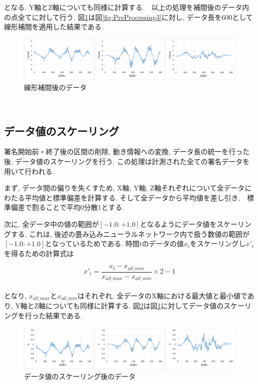 \noindent
となる. Y軸とZ軸についても同様に計算する.　以上の処理を補間後のデータ内の点全てに対して行う. 図\ref{fig:PreProcessing5}は図\ref{fig:PreProcessing3}に対し, データ長を600として線形補間を適用した結果である.
\\
\begin{figure}[htbp]
  \begin{center}
    \includegraphics[clip,width=16.0cm]{./images/PreProcessing5.png}
    \caption{線形補間後のデータ}
    \label{fig:PreProcessing5}
  \end{center}
\end{figure}\\

\subsection{データ値のスケーリング}

署名開始前・終了後の区間の削除, 動き情報への変換, データ長の統一を行った後, データ値のスケーリングを行う. この処理は計測された全ての署名データを用いて行われる.

まず, データ間の偏りを失くすため, X軸, Y軸, Z軸それぞれについて全データにわたる平均値と標準偏差を計算する. そして全データから平均値を差し引き,　標準偏差で割ることで平均0分散1とする.

次に, 全データ中の値の範囲が$[-1.0:+1.0]$となるようにデータ値をスケーリングする. これは, 後述の畳み込みニューラルネットワーク内で扱う数値の範囲が$[-1.0:+1.0]$となっているためである. 時間$t$のデータの値$x_t$をスケーリングし$x'_t$を得るための計算式は

\begin{equation}
x'_t = \frac{x_t - x_{all\_min}}{x_{all\_max} - x_{all\_min}} \times 2 - 1 \label{eq:eq5}
\end{equation}\\

\noindent
となり, $x_{all\_max}$と$x_{all\_min}$はそれぞれ, 全データのX軸における最大値と最小値であり, Y軸とZ軸についても同様に計算する.
図\ref{fig:PreProcessing6}は図\ref{fig:PreProcessing5}に対してデータ値のスケーリングを行った結果である. 
\\
\begin{figure}[htbp]
  \begin{center}
    \includegraphics[clip,width=16.0cm]{./images/PreProcessing6.png}
    \caption{データ値のスケーリング後のデータ}
    \label{fig:PreProcessing6}
  \end{center}
\end{figure}\\


